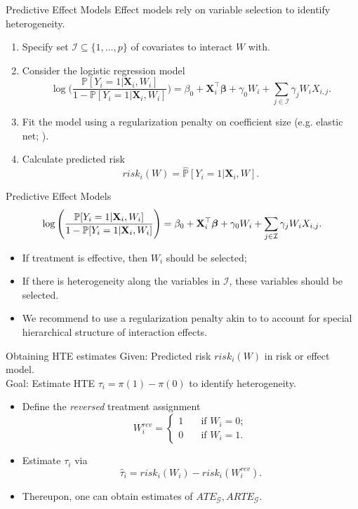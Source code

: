 \documentclass[11pt]{beamer}
\newcommand{\X}{\mathbf{X}}
\renewcommand{\P}{\mathbb{P}}
\newcommand{\G}{\mathcal{G}}
\begin{document}
\begin{frame}{Predictive Effect Models}
Effect models \citep{kent2020path} rely on variable selection to identify heterogeneity.
\begin{enumerate}
	\item Specify set $\mathcal{I} \subseteq \{1,\dots,p\}$ of covariates to interact $W$ with.
	\item Consider the logistic regression model
	\[
	\log \Bigg( \frac{\P[Y_i = 1 | \X_i, W_i]}{1 - \P[Y_i = 1 | \X_i, W_i]} \Bigg)
	=
	\beta_0 + \X_i^\top \bm{\beta} + \gamma_0 W_i + \sum_{j\in\mathcal{I}} \gamma_j W_i X_{i,j}.
	\]
	\item Fit the model using a regularization penalty on coefficient size (e.g. elastic net; \citealp{zou2005}).
	\item Calculate predicted risk \[risk_i(W) = \widehat{\P}[Y_i = 1 | \X_i, W].\]
\end{enumerate}
\end{frame}

\begin{frame}{Predictive Effect Models}
\[
	\log \Bigg( \frac{\P[Y_i = 1 | \X_i, W_i]}{1 - \P[Y_i = 1 | \X_i, W_i]} \Bigg)
	=
	\beta_0 + \X_i^\top \bm{\beta} + \gamma_0 W_i + \sum_{j\in\mathcal{I}} \gamma_j W_i X_{i,j}. \bigskip
\]

\begin{itemize}\setlength\itemsep{1em}
	\item If treatment is effective, then $W_i$ should be selected;
	\item If there is heterogeneity along the variables in $\mathcal{I}$, these variables should be selected. 
	\item We recommend to use a regularization penalty akin to \cite{bien2013} to account for special hierarchical structure of interaction effects.
\end{itemize}
\end{frame}


\begin{frame}{Obtaining HTE estimates}
\alert{Given:} Predicted risk $risk_i(W)$ in risk or effect model.\\\medskip
\alert{Goal:} Estimate HTE $\tau_i = \pi(1) - \pi(0)$ to identify heterogeneity.\bigskip

\begin{itemize}
\item Define the \textit{reversed} treatment assignment
\[
	W_i^{rev} = 
	\begin{cases}
	1 \quad &\text{if } W_i = 0;\\
	0 \quad &\text{if } W_i = 1.
	\end{cases}
\] 
\item Estimate $\tau_i$ via
\[
	\widehat{\tau}_i = risk_i(W_i) - risk_i(W_i^{rev}).
\]
\item Thereupon, one can obtain estimates of $ATE_{\G}, ARTE_{\G}$.
\end{itemize}
\end{frame}
\end{document}
